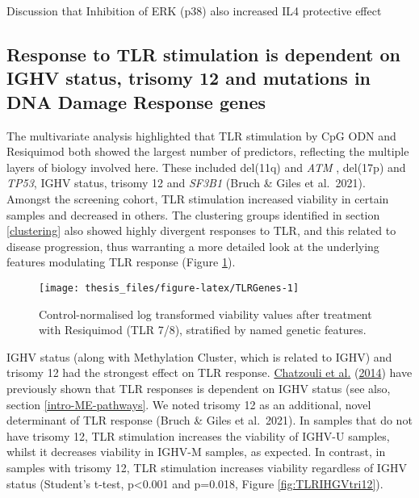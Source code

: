 \documentclass[11pt, a4paper, twosided]{book}
\begin{document}
Discussion that Inhibition of ERK (p38) also increased IL4 protective effect

\hypertarget{response-to-tlr-stimulation-is-dependent-on-ighv-status-trisomy-12-and-mutations-in-dna-damage-response-genes}{%
\subsection{Response to TLR stimulation is dependent on IGHV status, trisomy 12 and mutations in DNA Damage Response genes}\label{response-to-tlr-stimulation-is-dependent-on-ighv-status-trisomy-12-and-mutations-in-dna-damage-response-genes}}

The multivariate analysis highlighted that TLR stimulation by CpG ODN and Resiquimod both showed the largest number of predictors, reflecting the multiple layers of biology involved here. These included del(11q) and \emph{ATM} , del(17p) and \emph{TP53}, IGHV status, trisomy 12 and \emph{SF3B1} (Bruch \& Giles et al.~2021). Amongst the screening cohort, TLR stimulation increased viability in certain samples and decreased in others. The clustering groups identified in section \ref{clustering} also showed highly divergent responses to TLR, and this related to disease progression, thus warranting a more detailed look at the underlying features modulating TLR response (Figure \ref{fig:TLRGenes}).


\begin{figure}

{\centering \texttt{[image: thesis\_files/figure-latex/TLRGenes-1]} 

}

\caption{Control-normalised log transformed viability values after treatment with Resiquimod (TLR 7/8), stratified by named genetic features.}\label{fig:TLRGenes}
\end{figure}
IGHV status (along with Methylation Cluster, which is related to IGHV) and trisomy 12 had the strongest effect on TLR response. \protect\hyperlink{ref-Chatzouli2014}{Chatzouli et al.} (\protect\hyperlink{ref-Chatzouli2014}{2014}) have previously shown that TLR responses is dependent on IGHV status (see also, section \ref{intro-ME-pathways}. We noted trisomy 12 as an additional, novel determinant of TLR response (Bruch \& Giles et al.~2021). In samples that do not have trisomy 12, TLR stimulation increases the viability of IGHV-U samples, whilst it decreases viability in IGHV-M samples, as expected. In contrast, in samples with trisomy 12, TLR stimulation increases viability regardless of IGHV status (Student's t-test, p\textless0.001 and p=0.018, Figure \ref{fig:TLRIHGVtri12}).
\end{document}
